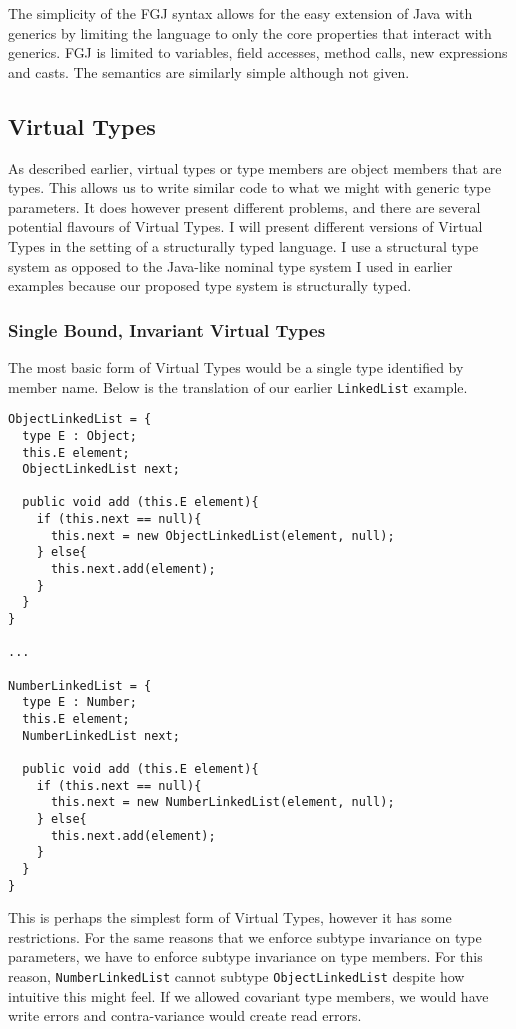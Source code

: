 \documentclass[11pt
              , a4paper
              , twoside
              , openright
              ]{report}
\begin{document}
The simplicity of the FGJ syntax allows for the easy extension of Java with generics \cite{OGJ FOIGJ} by limiting the language to only the core properties that interact with generics. FGJ is limited to variables, field accesses, method calls, new expressions and casts. The semantics are similarly simple although not given. 

\subsection{Virtual Types}
As described earlier, virtual types or type members are object members that are types. This allows us to write similar code to what we might with generic type parameters. It does however present different problems, and there are several potential flavours of Virtual Types. I will present different versions of Virtual Types in the setting of a structurally typed language. I use a structural type system as opposed to the Java-like nominal type system I used in earlier examples because our proposed type system is structurally typed.

\subsubsection{Single Bound, Invariant Virtual Types}
The most basic form of Virtual Types would be a single type identified by member name. Below is the translation of our earlier \verb|LinkedList| example.
\begin{lstlisting}[mathescape, style=custom_lang]
ObjectLinkedList = {
  type E : Object;
  this.E element;
  ObjectLinkedList next;
	
  public void add (this.E element){
    if (this.next == null){
      this.next = new ObjectLinkedList(element, null);
    } else{
      this.next.add(element);
    }
  }
}

...

NumberLinkedList = {
  type E : Number;
  this.E element;
  NumberLinkedList next;
	    
  public void add (this.E element){
    if (this.next == null){
      this.next = new NumberLinkedList(element, null);
    } else{
      this.next.add(element);
    }
  }
}
\end{lstlisting}
This is perhaps the simplest form of Virtual Types, however it has some restrictions.  For the same reasons that we enforce subtype invariance on type parameters, we have to enforce subtype invariance on type members. For this reason, \verb|NumberLinkedList| cannot subtype \verb|ObjectLinkedList| despite how intuitive this might feel. If we allowed covariant type members, we would have write errors and contra-variance would create read errors.
\end{document}
